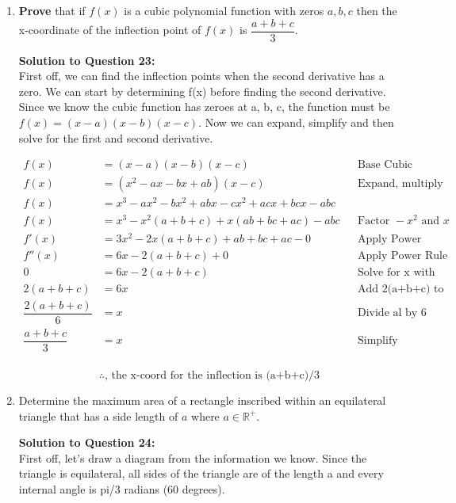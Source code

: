 \documentclass[12pt]{book}
\begin{document}
\begin{enumerate}
\newpage

\item \textbf{Prove} that if $f(x)$ is a cubic polynomial function with zeros $a,b,c$ then the x-coordinate of the inflection point of $f(x)$ is $\dfrac{a+b+c}{3}$.

\vspace{0.3cm} 
\textbf{Solution to Question 23:}\\
First off, we can find the inflection points when 
the second derivative has a zero. We can start by determining f(x) 
before finding the second derivative. Since we know the cubic function has 
zeroes at a, b, c, the function must be $f(x) = (x-a)(x-b)(x-c)$. Now we can 
expand, simplify and then solve for the first and second derivative. 

\addtolength{\jot}{0.3em}
\begin{align*}
    f(x) &= (x-a)(x-b)(x-c) && \text{Base Cubic Function} \\
    f(x) &= (x^2-ax-bx+ab)(x-c) && \text{Expand, multiply brackets} \\
    f(x) &= x^3-ax^2-bx^2+abx-cx^2 +acx+bcx-abc \\
    f(x) &= x^3 - x^2(a+b+c) + x(ab+bc+ac)-abc && \text{Factor } -x^2 \text{ and } x \\
    f'(x) &= 3x^2 -2x(a+b+c) + ab+bc+ac - 0 && \text{Apply Power Rule, get 1st derivative} \\
    f''(x) &= 6x -2(a+b+c) + 0 && \text{Apply Power Rule again, get 2nd derivative} \\
    0 &= 6x -2(a+b+c) && \text{Solve for x with f''(x) = 0 to find inflection} \\
    2(a+b+c) &= 6x  && \text{Add 2(a+b+c) to both sides} \\
    \dfrac{2(a+b+c)}{6} &= x  && \text{Divide al by 6} \\
    \dfrac{a+b+c}{3} &= x  && \text{Simplify} \\
\end{align*}

\vspace{-0.5cm}
$$\boxed{\therefore \text{, the x-coord for the inflection is (a+b+c)/3}}$$

\newpage


\item Determine the maximum area of a rectangle inscribed within an equilateral triangle that has a side length of $a$ where $a \in \mathbb{R^+}$. 

\vspace{0.3cm} 
\textbf{Solution to Question 24:}\\
First off, let's draw a diagram from the information we know. Since the 
triangle is equilateral, all sides of the triangle are of the length a and 
every internal angle is pi/3 radians (60 degrees).  


\end{enumerate}
\end{document}
